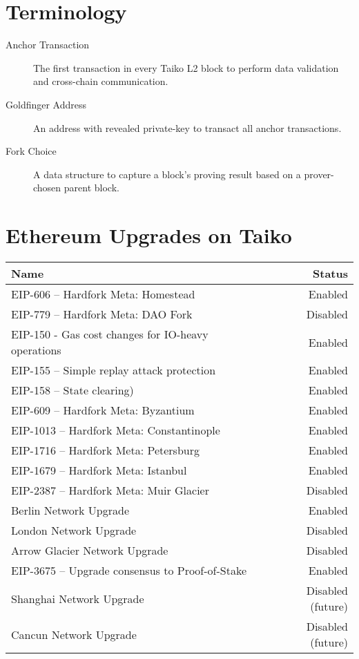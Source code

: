 \documentclass[9pt,oneside]{amsart}
\begin{document}



\appendix

\section{Terminology} \label{ch:Terminology}

\begin{description}
\item[Anchor Transaction] The first transaction in every Taiko L2 block to perform data validation and cross-chain communication.

\item[Goldfinger Address] An address with revealed private-key to transact all anchor transactions.

\item[Fork Choice] A data structure to capture a block's proving result based on a prover-chosen parent block.

\end{description}


\section{Ethereum Upgrades on Taiko}\label{sec:eips}

\begin{tabu}{l r }
\toprule
Name & Status \\
\midrule
EIP-606 -- Hardfork Meta: Homestead & \quad \quad \quad \quad \quad \quad \quad \quad \quad \quad \quad \quad \quad \quad \quad \quad \quad \quad \quad \quad \quad \quad  Enabled \\
EIP-779 -- Hardfork Meta: DAO Fork & Disabled \\
EIP-150 - Gas cost changes for IO-heavy operations & Enabled \\
EIP-155 -- Simple replay attack protection &  Enabled \\
EIP-158 -- State clearing) & Enabled \\
EIP-609 -- Hardfork Meta: Byzantium & Enabled \\
EIP-1013 -- Hardfork Meta: Constantinople & Enabled \\
EIP-1716 -- Hardfork Meta: Petersburg & Enabled \\
EIP-1679 -- Hardfork Meta: Istanbul & Enabled \\
EIP-2387 -- Hardfork Meta: Muir Glacier & Disabled \\
Berlin Network Upgrade & Enabled \\
London Network Upgrade & Disabled \\
Arrow Glacier Network Upgrade & Disabled \\
EIP-3675 -- Upgrade consensus to Proof-of-Stake & Enabled \\
Shanghai Network Upgrade & Disabled (future) \\
Cancun Network Upgrade & Disabled (future)  \\
\bottomrule
\end{tabu}
\end{document}
